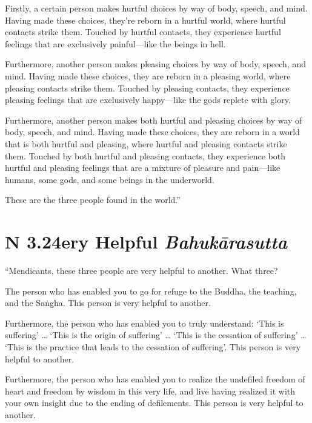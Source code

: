 \documentclass[12pt,openany]{book}%
\newcommand*{\suttatitleacronym}[1]{\smaller[2]{#1}\vspace*{.3em}}
\newcommand*{\suttatitletranslation}[1]{\linebreak{#1}}
\newcommand*{\suttatitleroot}[1]{\linebreak\smaller[2]\itshape{#1}}
\newcommand*{\tocacronym}[1]{\hspace*{-3.3em}{#1}\quad}
\newcommand*{\toctranslation}[1]{#1}
\newcommand*{\tocroot}[1]{(\textit{#1})}
\begin{document}
Firstly, a certain person makes hurtful choices by way of body, speech, and mind. Having made these choices, they’re reborn in a hurtful world, where hurtful contacts strike them. Touched by hurtful contacts, they experience hurtful feelings that are exclusively painful—like the beings in hell. 

Furthermore, another person makes pleasing choices by way of body, speech, and mind. Having made these choices, they are reborn in a pleasing world, where pleasing contacts strike them. Touched by pleasing contacts, they experience pleasing feelings that are exclusively happy—like the gods replete with glory. 

Furthermore, another person makes both hurtful and pleasing choices by way of body, speech, and mind. Having made these choices, they are reborn in a world that is both hurtful and pleasing, where hurtful and pleasing contacts strike them. Touched by both hurtful and pleasing contacts, they experience both hurtful and pleasing feelings that are a mixture of pleasure and pain—like humans, some gods, and some beings in the underworld. 

These are the three people found in the world.” 

%
\section*{{\suttatitleacronym AN 3.24}{\suttatitletranslation Very Helpful }{\suttatitleroot Bahukārasutta}}
\addcontentsline{toc}{section}{\tocacronym{AN 3.24} \toctranslation{Very Helpful } \tocroot{Bahukārasutta}}

“Mendicants, these three people are very helpful to another. What three? 

The person who has enabled you to go for refuge to the Buddha, the teaching, and the \textsanskrit{Saṅgha}. This person is very helpful to another. 

Furthermore, the person who has enabled you to truly understand: ‘This is suffering’ … ‘This is the origin of suffering’ … ‘This is the cessation of suffering’ … ‘This is the practice that leads to the cessation of suffering’. This person is very helpful to another. 

Furthermore, the person who has enabled you to realize the undefiled freedom of heart and freedom by wisdom in this very life, and live having realized it with your own insight due to the ending of defilements. This person is very helpful to another. 
\end{document}
